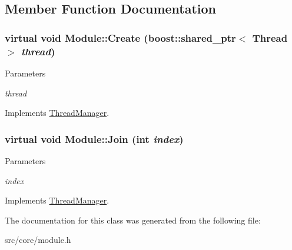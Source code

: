 \subsection{Member Function Documentation}
\hypertarget{classModule_a9984bf9d8b1ea6e280c8c47cdb56e906}{
\subsubsection[{Create}]{\setlength{\rightskip}{0pt plus 5cm}virtual void Module::Create (boost::shared\_\-ptr$<$ Thread $>$ {\em thread})}}
\label{d3/d9c/classModule_a9984bf9d8b1ea6e280c8c47cdb56e906}

\begin{DoxyParams}{Parameters}
\item[{\em thread}]\end{DoxyParams}


Implements \hyperlink{classThreadManager_afad6766592d98c6c0a2129f45e6a346e}{ThreadManager}.

\hypertarget{classModule_ac141815618543512136b7f4e0c90d311}{
\subsubsection[{Join}]{\setlength{\rightskip}{0pt plus 5cm}virtual void Module::Join (int {\em index})}}
\label{d3/d9c/classModule_ac141815618543512136b7f4e0c90d311}

\begin{DoxyParams}{Parameters}
\item[{\em index}]\end{DoxyParams}


Implements \hyperlink{classThreadManager_a3c1b72b44ca4ffa3652088d44937b9d0}{ThreadManager}.



The documentation for this class was generated from the following file:\begin{DoxyCompactItemize}
\item 
src/core/module.h\end{DoxyCompactItemize}
